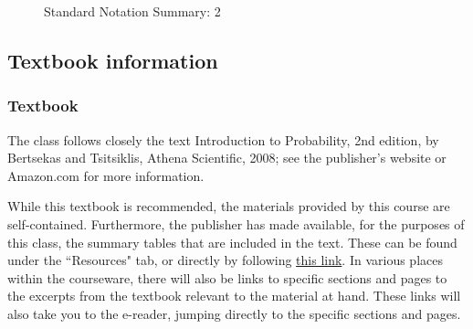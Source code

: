 \documentclass[pdftex, brazil, 12pt, twoside]{article}
\begin{document}
\begin{figure}[H]
  \begin{center}
    \caption{Standard Notation Summary: 2}
    \label{fig:std-ntt-2}
  \end{center}
\end{figure}


\subsection{Textbook information}
\label{ovw0-book}

\subsubsection{Textbook}
\label{ovw0-book-textbook}

The class follows closely the text Introduction to Probability, 2nd edition, by
Bertsekas and Tsitsiklis, Athena Scientific, 2008; see the
publisher's website or
Amazon.com for more information.

While this textbook is recommended, the materials provided by this course are
self-contained. Furthermore, the publisher has made available, for the purposes
of this class, the summary tables that are included in the text. These can be found
under the “Resources" tab, or directly by following
\href{https://courses.edx.org/courses/course-v1:MITx+6.431x+3T2018/pdfbook/0/chapter/1/1}{this link}.
In various places
within the courseware, there will also be links to specific sections and pages to
the excerpts from the textbook relevant to the material at hand. These links will
also take you to the e-reader, jumping directly to the specific sections and pages.
\end{document}
